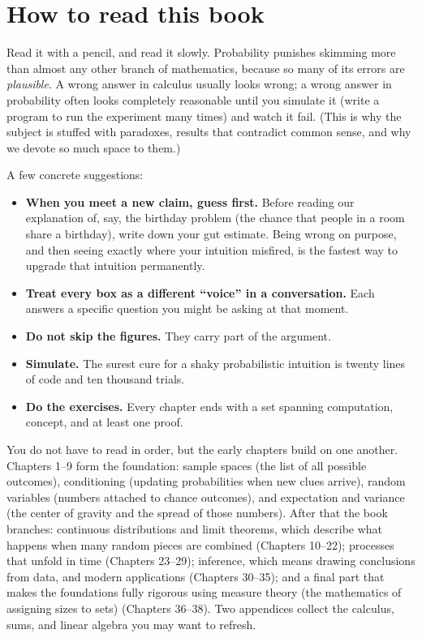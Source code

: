 \section*{How to read this book}
\label{ch00:how-to-read}

Read it with a pencil, and read it slowly. Probability punishes skimming more
than almost any other branch of mathematics, because so many of its errors are
\emph{plausible}. A wrong answer in calculus usually looks wrong; a wrong answer
in probability often looks completely reasonable until you simulate it (write a program to run the experiment many times) and watch
it fail. (This is why the subject is stuffed with paradoxes, results that
contradict common sense, and why we devote so much space to them.)

A few concrete suggestions:

\begin{itemize}
  \item \textbf{When you meet a new claim, guess first.} Before reading our
    explanation of, say, the birthday problem (the chance that people in a room share a birthday), write down your gut estimate.
    Being wrong on purpose, and then seeing exactly where your intuition
    misfired, is the fastest way to upgrade that intuition permanently.
  \item \textbf{Treat every box as a different ``voice'' in a conversation.}
    Each answers a specific question you might be asking at that moment.
  \item \textbf{Do not skip the figures.} They carry part of the argument.
  \item \textbf{Simulate.} The surest cure for a
    shaky probabilistic intuition is twenty lines of code and ten thousand
    trials.
  \item \textbf{Do the exercises.} Every chapter ends with a set spanning
    computation, concept, and at least one proof.
\end{itemize}

\begin{marginnotebox}
You do not have to read in order, but the early chapters build on one
another. Chapters 1--9 form the foundation: sample spaces (the list
of all possible outcomes), conditioning (updating probabilities when new clues
arrive), random variables (numbers attached to chance outcomes), and expectation and
variance (the center of gravity and the spread of those numbers). After that the book
branches: continuous distributions and limit theorems, which describe what happens
when many random pieces are combined (Chapters
10--22); processes that unfold in time (Chapters 23--29); inference, which means
drawing conclusions from data, and modern
applications (Chapters 30--35); and a final part that makes the foundations
fully rigorous using measure theory
(the mathematics of assigning sizes to sets)
(Chapters 36--38). Two appendices collect the calculus, sums, and linear
algebra you may want to refresh.
\end{marginnotebox}

